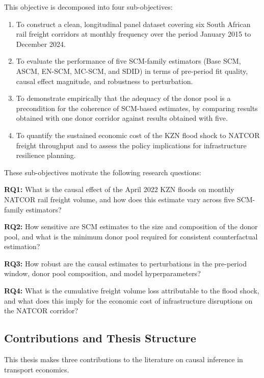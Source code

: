 This objective is decomposed into four sub-objectives:
\begin{enumerate}
  \item To construct a clean, longitudinal panel dataset covering six
        South African rail freight corridors at monthly frequency
        over the period January 2015 to December 2024.
  \item To evaluate the performance of five SCM-family estimators
        (Base SCM, ASCM, EN-SCM, MC-SCM, and SDID) in terms of
        pre-period fit quality, causal effect magnitude, and
        robustness to perturbation.
  \item To demonstrate empirically that the adequacy of the donor
        pool is a precondition for the coherence of SCM-based
        estimates, by comparing results obtained with one donor
        corridor against results obtained with five.
  \item To quantify the sustained economic cost of the KZN flood
        shock to NATCOR freight throughput and to assess the
        policy implications for infrastructure resilience planning.
\end{enumerate}

These sub-objectives motivate the following research questions:

\medskip
\noindent\textbf{RQ1:} What is the causal effect of the April 2022
KZN floods on monthly NATCOR rail freight volume, and how does this
estimate vary across five SCM-family estimators?

\medskip
\noindent\textbf{RQ2:} How sensitive are SCM estimates to the size
and composition of the donor pool, and what is the minimum donor pool
required for consistent counterfactual estimation?

\medskip
\noindent\textbf{RQ3:} How robust are the causal estimates to
perturbations in the pre-period window, donor pool composition, and
model hyperparameters?

\medskip
\noindent\textbf{RQ4:} What is the cumulative freight volume loss
attributable to the flood shock, and what does this imply for the
economic cost of infrastructure disruptions on the NATCOR corridor?

\subsection{Contributions and Thesis Structure}
\label{sec:contrib}

This thesis makes three contributions to the literature on causal
inference in transport economics.

